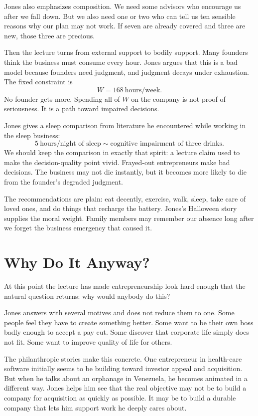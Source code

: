 Jones also emphasizes composition. We need some advisors who encourage us after we fall down. But we also need one or two who can tell us ten sensible reasons why our plan may not work. If seven are already covered and three are new, those three are precious.

Then the lecture turns from external support to bodily support. Many founders think the business must consume every hour. Jones argues that this is a bad model because founders need judgment, and judgment decays under exhaustion. The fixed constraint is
\begin{equation}
W=168\ \text{hours/week}.
\end{equation}
No founder gets more. Spending all of \(W\) on the company is not proof of seriousness. It is a path toward impaired decisions.

Jones gives a sleep comparison from literature he encountered while working in the sleep business:
\begin{equation}
5\ \text{hours/night of sleep}
\sim
\text{cognitive impairment of three drinks}.
\end{equation}
We should keep the comparison in exactly that spirit: a lecture claim used to make the decision-quality point vivid. Frayed-out entrepreneurs make bad decisions. The business may not die instantly, but it becomes more likely to die from the founder's degraded judgment.

The recommendations are plain: eat decently, exercise, walk, sleep, take care of loved ones, and do things that recharge the battery. Jones's Halloween story supplies the moral weight. Family members may remember our absence long after we forget the business emergency that caused it.

\section{Why Do It Anyway?}

At this point the lecture has made entrepreneurship look hard enough that the natural question returns: why would anybody do this?

Jones answers with several motives and does not reduce them to one. Some people feel they have to create something better. Some want to be their own boss badly enough to accept a pay cut. Some discover that corporate life simply does not fit. Some want to improve quality of life for others.

The philanthropic stories make this concrete. One entrepreneur in health-care software initially seems to be building toward investor appeal and acquisition. But when he talks about an orphanage in Venezuela, he becomes animated in a different way. Jones helps him see that the real objective may not be to build a company for acquisition as quickly as possible. It may be to build a durable company that lets him support work he deeply cares about.

